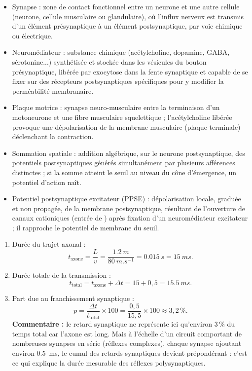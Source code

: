 \documentclass[11pt]{article}
\newcommand{\cle}[1]{{\popxbold\color{popdark}#1}}
\begin{document}
\begin{corrige}
\begin{itemize}
\item \cle{Synapse} : zone de contact fonctionnel entre un neurone et une autre cellule (neurone, cellule musculaire ou glandulaire), où l'influx nerveux est transmis d'un élément présynaptique à un élément postsynaptique, par voie chimique ou électrique.
\item \cle{Neuromédiateur} : substance chimique (acétylcholine, dopamine, GABA, sérotonine...) synthétisée et stockée dans les vésicules du bouton présynaptique, libérée par exocytose dans la fente synaptique et capable de se fixer sur des récepteurs postsynaptiques spécifiques pour y modifier la perméabilité membranaire.
\item \cle{Plaque motrice} : synapse neuro-musculaire entre la terminaison d'un motoneurone et une fibre musculaire squelettique ; l'acétylcholine libérée provoque une dépolarisation de la membrane musculaire (plaque terminale) déclenchant la contraction.
\item \cle{Sommation spatiale} : addition algébrique, sur le neurone postsynaptique, des potentiels postsynaptiques générés simultanément par plusieurs afférences distinctes ; si la somme atteint le seuil au niveau du cône d'émergence, un potentiel d'action naît.
\item \cle{Potentiel postsynaptique excitateur} (PPSE) : dépolarisation locale, graduée et non propagée, de la membrane postsynaptique, résultant de l'ouverture de canaux cationiques (entrée de ) après fixation d'un neuromédiateur excitateur ; il rapproche le potentiel de membrane du seuil.
\end{itemize}
\end{corrige}

\begin{corrige}
\begin{enumerate}
\item Durée du trajet axonal :
\[ t_{\text{axone}} = \frac{L}{v} = \frac{\SI{1,2}{m}}{\SI{80}{m.s^{-1}}} = \SI{0,015}{s} = \SI{15}{ms}. \]
\item Durée totale de la transmission :
\[ t_{\text{total}} = t_{\text{axone}} + \Delta t = 15 + 0,5 = \SI{15,5}{ms}. \]
\item Part due au franchissement synaptique :
\[ p = \frac{\Delta t}{t_{\text{total}}} \times 100 = \frac{0,5}{15,5} \times 100 \approx 3,2\,\%. \]
\textbf{Commentaire :} le retard synaptique ne représente ici qu'environ 3\,\% du temps total car l'axone est long. Mais à l'échelle d'un circuit comportant de nombreuses synapses en série (réflexes complexes), chaque synapse ajoutant environ \SI{0,5}{ms}, le cumul des retards synaptiques devient prépondérant : c'est ce qui explique la durée mesurable des réflexes polysynaptiques.
\end{enumerate}
\end{corrige}
\end{document}
